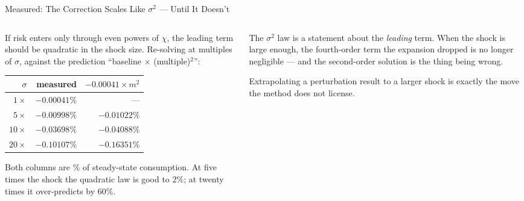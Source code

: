 \begin{frame}{Measured: The Correction Scales Like $\sigma^{2}$ --- Until It Doesn't}
\begin{columns}[T]
\begin{column}{0.5\textwidth}
\small
If risk enters only through even powers of $\chi$, the leading term should be quadratic in the shock
size. Re-solving at multiples of $\sigma$, against the prediction ``baseline $\times$
(multiple)$^{2}$'':
\medskip
\begin{center}\footnotesize
\begin{tabularx}{\linewidth}{@{}r r r@{}}
\toprule
$\sigma$ & \textbf{measured} & $-0.00041\times m^{2}$ \\
\midrule
$1\times$  & $-0.00041\%$ & --- \\
$5\times$  & $-0.00998\%$ & $-0.01022\%$ \\
$10\times$ & $-0.03698\%$ & $-0.04088\%$ \\
$20\times$ & $-0.10107\%$ & $-0.16351\%$ \\
\bottomrule
\end{tabularx}
\end{center}
\medskip
Both columns are \% of steady-state consumption. At five times the shock the quadratic law is good
to $2\%$; at twenty times it over-predicts by $60\%$.
\end{column}
\begin{column}{0.47\textwidth}
\begin{conceptbox}[title=\textbf{Read the failure, not the success}]\small
The $\sigma^{2}$ law is a statement about the \emph{leading} term. When the shock is large enough, the fourth-order term the expansion dropped is no longer negligible --- and the second-order solution is the thing being wrong.
\end{conceptbox}
\medskip
\begin{cautionbox}\footnotesize
Extrapolating a perturbation result to a larger shock is exactly the move the method does not license.
\end{cautionbox}
\end{column}
\end{columns}
\vspace{1mm}
\end{frame}

